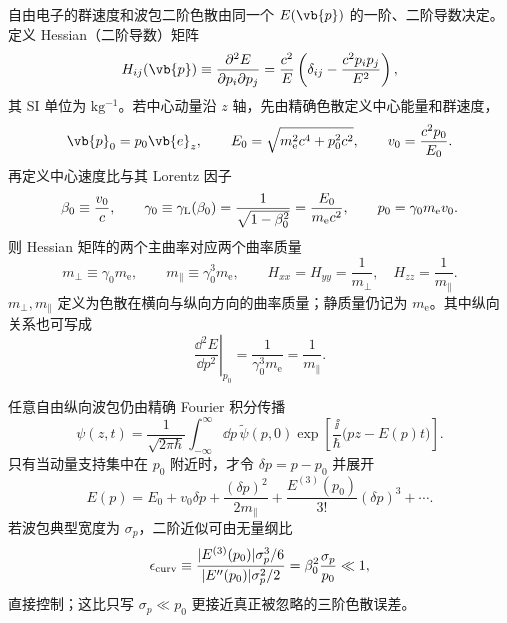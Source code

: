自由电子的群速度和波包二阶色散由同一个 $E(\vb{p})$ 的一阶、二阶导数决定。定义 Hessian（二阶导数）矩阵
\begin{equation}
 {
 H_{ij}(\vb{p})
 \equiv\frac{\partial^2E}{\partial p_i\partial p_j}
 =\frac{c^2}{E}
 \left(\delta_{ij}-\frac{c^2p_ip_j}{E^2}\right),}
 \label{eq:exact_dispersion_hessian}
\end{equation}
其 SI 单位为 $\mathrm{kg^{-1}}$。若中心动量沿 $z$ 轴，先由精确色散定义中心能量和群速度，
\begin{equation*}
 \vb{p}_0=p_0\vb{e}_z,
 \qquad
 E_0=\sqrt{m_{\mathrm e}^2c^4+p_0^2c^2},
 \qquad
 v_0=\frac{c^2p_0}{E_0}.
\end{equation*}
再定义中心速度比与其 Lorentz 因子
\begin{equation*}
 \beta_0\equiv\frac{v_0}{c},
 \qquad
 \gamma_0\equiv\gamma_{\rm L}(\beta_0)
 =\frac1{\sqrt{1-\beta_0^2}}
 =\frac{E_0}{m_{\mathrm e} c^2},
 \qquad
 p_0=\gamma_0m_{\mathrm e} v_0.
\end{equation*}
则 Hessian 矩阵的两个主曲率对应两个曲率质量
\begin{equation}
 {
 m_\perp\equiv\gamma_0m_{\mathrm e},
 \qquad
 m_\parallel\equiv\gamma_0^3m_{\mathrm e},}
 \qquad
 H_{xx}=H_{yy}=\frac1{m_\perp},
 \quad
 H_{zz}=\frac1{m_\parallel}.
 \label{eq:dispersion-hessian-principal-r15}
\end{equation}
$m_\perp,m_\parallel$ 定义为色散在横向与纵向方向的曲率质量；静质量仍记为 $m_{\mathrm e}$。其中纵向关系也可写成
\begin{equation}
 \left.\frac{\dd^2 E}{\dd p^2}\right|_{p_0}
 =\frac1{\gamma_0^3m_{\mathrm e}}
 =\frac1{m_\parallel}.
 \label{eq:longitudinal-mass}
\end{equation}

任意自由纵向波包仍由精确 Fourier 积分传播
\begin{equation}
 \psi(z,t)=\frac{1}{\sqrt{2\pi\hbar}}
 \int_{-\infty}^{\infty}\dd p\,
 \widetilde\psi(p,0)
 \exp\!\left[\frac{\ii}{\hbar}\bigl(pz-E(p)t\bigr)\right].
 \label{eq:exact-wavepacket}
\end{equation}
只有当动量支持集中在 $p_0$ 附近时，才令 $\delta p=p-p_0$ 并展开
\begin{equation}
 E(p)=E_0+v_0\delta p+\frac{(\delta p)^2}{2m_\parallel}
 +\frac{E^{(3)}(p_0)}{3!}(\delta p)^3+\cdots.
 \label{eq:dispersion-taylor}
\end{equation}
若波包典型宽度为 $\sigma_p$，二阶近似可由无量纲比
\begin{equation}
 {
 \epsilon_{\rm curv}\equiv
 \frac{|E^{(3)}(p_0)|\sigma_p^3/6}
 {|E''(p_0)|\sigma_p^2/2}
 =\beta_0^2\frac{\sigma_p}{p_0}\ll1},
 \label{eq:third-order-control}
\end{equation}
直接控制；这比只写 $\sigma_p\ll p_0$ 更接近真正被忽略的三阶色散误差。

